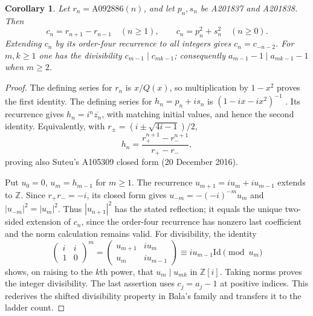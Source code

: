 \documentclass[11pt]{article}
\newtheorem{corollary}{Corollary}
\begin{document}
\begin{corollary}\label{cor:auxiliary}
Let $r_n=\mathrm{A092886}(n)$, and let $p_n,s_n$ be A201837 and
A201838. Then
\[
 c_n=r_{n+1}-r_{n-1}\quad(n\geq1),\qquad
 c_n=p_n^2+s_n^2\quad(n\geq0).
\]
Extending $c_n$ by its order-four recurrence to all integers gives
$c_n=c_{-n-2}$. For $m,k\geq1$ one has the divisibility
$c_{m-1}\mid c_{mk-1}$; consequently
$a_{m-1}-1\mid a_{mk-1}-1$ when $m\geq2$.
\end{corollary}
\begin{proof}
The defining series for $r_n$ is $x/Q(x)$, so multiplication by
$1-x^2$ proves the first identity. The defining series for
$h_n=p_n+is_n$ is $(1-ix-ix^2)^{-1}$ \cite{auxiliary}.
Its recurrence gives $h_n=i^n\overline{z_n}$, with matching
initial values, and hence the second identity. Equivalently,
with $r_\pm=(i\pm\sqrt{4i-1})/2$,
\[
 h_n=\frac{r_+^{n+1}-r_-^{n+1}}{r_+-r_-},
\]
proving also Suteu's A105309 closed form (20 December 2016).

Put $u_0=0$, $u_m=h_{m-1}$ for $m\geq1$.
The recurrence $u_{m+1}=iu_m+iu_{m-1}$ extends to $\mathbb Z$.
Since $r_+r_-=-i$, its closed form gives
$u_{-m}=-(-i)^{-m}u_m$ and $|u_{-m}|^2=|u_m|^2$.
Thus $|u_{n+1}|^2$ has the stated reflection; it equals the
unique two-sided extension of $c_n$, since the order-four recurrence
has nonzero last coefficient and the norm calculation remains valid.
For divisibility, the identity
\[
 \begin{pmatrix}i&i\\1&0\end{pmatrix}^{m}
 =\begin{pmatrix}u_{m+1}&iu_m\\u_m&iu_{m-1}\end{pmatrix}
 \equiv iu_{m-1}\mathrm{Id}\pmod {u_m}
\]
shows, on raising to the $k$th power, that $u_m\mid u_{mk}$ in
$\mathbb Z[i]$. Taking norms proves the integer divisibility.
The last assertion uses $c_j=a_j-1$ at positive indices.
This rederives the shifted divisibility property in Bala's family
\cite[Eq.~(5)]{bala} and transfers it to the ladder count.
\end{proof}
\end{document}
